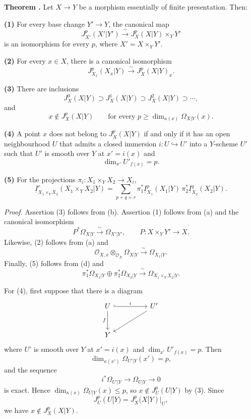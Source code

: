 \medskip
\noindent\textbf{Theorem .}
Let $X\longrightarrow Y$ be a morphism essentially of finite
presentation. Then:

\smallskip
\noindent\textbf{(1)} For every base change $Y'\longrightarrow Y$,
the canonical map
\[
J_{X'}^p(X'|Y')\xrightarrow{\ \sim\ }
J_X^p(X|Y)\times_YY'
\]
is an isomorphism for every $p$, where $X'=X\times_YY'$.

\smallskip
\noindent\textbf{(2)} For every $x\in X$, there is a canonical
isomorphism
\[
J_{X_x}^p(X_x|Y)\xrightarrow{\ \sim\ }J_X^p(X|Y)_x.
\]

\smallskip
\noindent\textbf{(3)} There are inclusions
\[
J_X^0(X|Y)\supset J_X^1(X|Y)\supset J_X^2(X|Y)\supset\cdots,
\]
and
\[
x\notin J_X^p(X|Y)
\qquad\text{for every }p\geq
\dim_{\kappa(x)}\Omega_{X|Y}(x).
\]

\smallskip
\noindent\textbf{(4)} A point $x$ does not belong to
$J_X^p(X|Y)$ if and only if it has an open neighbourhood $U$ that
admits a closed immersion $i:U\hookrightarrow U'$ into a $Y$-scheme
$U'$ such that $U'$ is smooth over $Y$ at $x'=i(x)$ and
\[
\dim_{x'}U'_{f(x)}=p.
\]

\smallskip
\noindent\textbf{(5)} For the projections
$\pi_i:X_1\times_YX_2\longrightarrow X_i$,
\[
\underline I_{X_1\times_YX_2}^r(X_1\times_YX_2|Y)
=\sum_{p+q=r}
 \pi_1^*\underline I_{X_1}^p(X_1|Y)\,
 \pi_2^*\underline I_{X_2}^q(X_2|Y).
\]

\smallskip
\noindent\textit{Proof.}
Assertion (3) follows from (b). Assertion (1) follows from (a)
and the canonical isomorphism
\[
P^*\Omega_{X|Y}\xrightarrow{\ \sim\ }\Omega_{X'|Y'},
\qquad P:X\times_YY'\longrightarrow X.
\]
Likewise, (2) follows from (a) and
\[
\mathcal O_{X,x}\otimes_{\mathcal O_X}\Omega_{X|Y}
\xrightarrow{\ \sim\ }\Omega_{X_x|Y}.
\]
Finally, (5) follows from (d) and
\[
\pi_1^*\Omega_{X_1|Y}\oplus\pi_2^*\Omega_{X_2|Y}
\xrightarrow{\ \sim\ }
\Omega_{X_1\times_YX_2|Y}.
\]

For (4), first suppose that there is a diagram
\[
\begin{tikzcd}[column sep=huge,row sep=large]
U \arrow[r,hook,"i"] \arrow[d,"f"']
  & U' \arrow[dl] \\
Y & {}
\end{tikzcd}
\]
where $U'$ is smooth over $Y$ at $x'=i(x)$ and
$\dim_{x'}U'_{f(x)}=p$. Then
\[
\dim_{\kappa(x')}\Omega_{U'|Y}(x')=p,
\]
and the sequence
\[
i^*\Omega_{U'|Y}\longrightarrow\Omega_{U|Y}\longrightarrow0
\]
is exact. Hence
$\dim_{\kappa(x)}\Omega_{U|Y}(x)\leq p$, so
$x\notin J_U^p(U|Y)$ by (3). Since
\[
J_U^p(U|Y)=J_X^p(X|Y)|_U,
\]
we have $x\notin J_X^p(X|Y)$.


